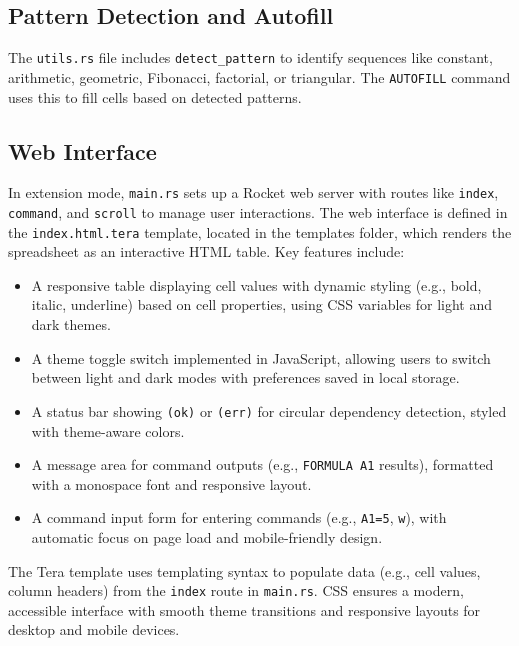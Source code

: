 \documentclass[12pt]{article}
\begin{document}
\subsection{Pattern Detection and Autofill}
The \texttt{utils.rs} file includes \texttt{detect\_pattern} to identify sequences like constant, arithmetic, geometric, Fibonacci, factorial, or triangular. The \texttt{AUTOFILL} command uses this to fill cells based on detected patterns.

\subsection{Web Interface}
In extension mode, \texttt{main.rs} sets up a Rocket web server with routes like \texttt{index}, \texttt{command}, and \texttt{scroll} to manage user interactions. The web interface is defined in the \texttt{index.html.tera} template, located in the templates folder, which renders the spreadsheet as an interactive HTML table. Key features include:
\begin{itemize}
    \item A responsive table displaying cell values with dynamic styling (e.g., bold, italic, underline) based on cell properties, using CSS variables for light and dark themes.
    \item A theme toggle switch implemented in JavaScript, allowing users to switch between light and dark modes with preferences saved in local storage.
    \item A status bar showing \texttt{(ok)} or \texttt{(err)} for circular dependency detection, styled with theme-aware colors.
    \item A message area for command outputs (e.g., \texttt{FORMULA A1} results), formatted with a monospace font and responsive layout.
    \item A command input form for entering commands (e.g., \texttt{A1=5}, \texttt{w}), with automatic focus on page load and mobile-friendly design.
\end{itemize}
The Tera template uses templating syntax to populate data (e.g., cell values, column headers) from the \texttt{index} route in \texttt{main.rs}. CSS ensures a modern, accessible interface with smooth theme transitions and responsive layouts for desktop and mobile devices.
\end{document}
